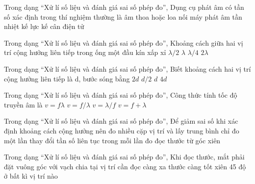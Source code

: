 \begin{ex}
Trong dạng “Xử lí số liệu và đánh giá sai số phép đo”, Dụng cụ phát âm có tần số xác định trong thí nghiệm thường là
\choice
{\True âm thoa hoặc loa nối máy phát âm tần}
{nhiệt kế}
{lực kế}
{cân điện tử}
\end{ex}

\begin{ex}
Trong dạng “Xử lí số liệu và đánh giá sai số phép đo”, Khoảng cách giữa hai vị trí cộng hưởng liên tiếp trong ống một đầu kín xấp xỉ
\choice
{\True $\lambda/2$}
{$\lambda$}
{$\lambda/4$}
{$2\lambda$}
\end{ex}

\begin{ex}
Trong dạng “Xử lí số liệu và đánh giá sai số phép đo”, Biết khoảng cách hai vị trí cộng hưởng liên tiếp là d, bước sóng bằng
\choice
{\True $2d$}
{$d/2$}
{$d$}
{$4d$}
\end{ex}

\begin{ex}
Trong dạng “Xử lí số liệu và đánh giá sai số phép đo”, Công thức tính tốc độ truyền âm là
\choice
{\True $v=f\lambda$}
{$v=f/\lambda$}
{$v=\lambda/f$}
{$v=f+\lambda$}
\end{ex}

\begin{ex}
Trong dạng “Xử lí số liệu và đánh giá sai số phép đo”, Để giảm sai số khi xác định khoảng cách cộng hưởng nên
\choice
{\True đo nhiều cặp vị trí và lấy trung bình}
{chỉ đo một lần}
{thay đổi tần số liên tục trong mỗi lần đo}
{đọc thước từ góc xiên}
\end{ex}

\begin{ex}
Trong dạng “Xử lí số liệu và đánh giá sai số phép đo”, Khi đọc thước, mắt phải đặt
\choice
{\True vuông góc với vạch chia tại vị trí cần đọc}
{càng xa thước càng tốt}
{xiên 45 độ}
{ở bất kì vị trí nào}
\end{ex}


